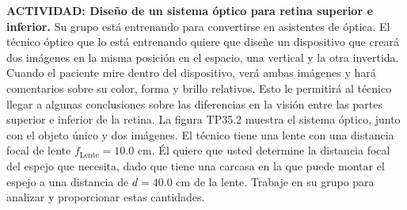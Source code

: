\item \textbf{ACTIVIDAD: Diseño de un sistema óptico para retina superior e inferior.}
Su grupo está entrenando para convertirse en asistentes de óptica. El técnico óptico que lo está entrenando quiere que diseñe un dispositivo que creará dos imágenes en la misma posición en el espacio, una vertical y la otra invertida. Cuando el paciente mire dentro del dispositivo, verá ambas imágenes y hará comentarios sobre su color, forma y brillo relativos. Esto le permitirá al técnico llegar a algunas conclusiones sobre las diferencias en la visión entre las partes superior e inferior de la retina. La figura TP35.2 muestra el sistema óptico, junto con el objeto único y dos imágenes. El técnico tiene una lente con una distancia focal de lente $f_{\text{Lente}} = 10.0\text{ cm}$. Él quiere que usted determine la distancia focal del espejo que necesita, dado que tiene una carcasa en la que puede montar el espejo a una distancia de $d = 40.0\text{ cm}$ de la lente. Trabaje en su grupo para analizar y proporcionar estas cantidades.

\begin{center}
\end{center}